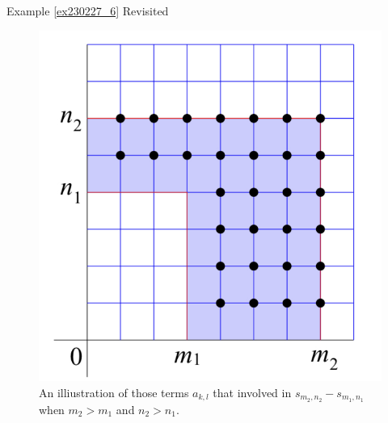 \begin{example}{\linkt Example \ref{ex230227_6} Revisited}
\begin{example}[label=ex230227_13]{}
\begin{example}{}
\begin{figure}[ht]
\centering
\includegraphics[scale=0.2]{Picture49.png}
\caption{An illiustration of those terms $a_{k,l}$  that involved in $s_{m_2, n_2}- s_{m_1, n_1}$ when $m_2>m_1$ and $n_2>n_1$.\fa}\label{figure49}
\end{figure}


\end{example}
\end{example}
\end{example}
